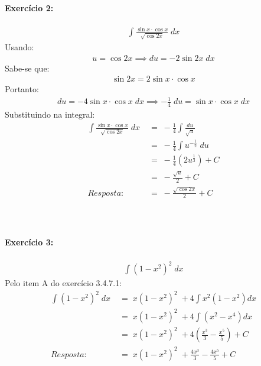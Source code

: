 \documentclass[12pt]{article}
\begin{document}
\paragraph{Exercício 2:}
\begin{align*}
\int \frac{\sin x \cdot \cos x}{\sqrt{\cos 2x}}\;dx
\end{align*}
Usando:
\begin{align*}
u = \cos 2x \implies du = -2 \sin 2x\;dx
\end{align*}
Sabe-se que:
\begin{align*}
\sin 2x = 2\sin x \cdot \cos x
\end{align*}
Portanto:
\begin{align*}
du = -4\sin x \cdot \cos x \;dx
\implies  - \frac {1}{4}\;du = \sin x \cdot \cos x \;dx
\end{align*}
Substituindo na integral:
\begin{align*}
\int \frac{\sin x \cdot \cos x}{\sqrt{\cos 2x}}\;dx 
&\;=\; - \frac {1}{4}\int \frac{du}{\sqrt{u}}\\
&\;=\;  - \frac {1}{4}\int u^{-\frac{1}{2}}\;du\\
&\;=\; - \frac {1}{4}\left ( 2u^{\frac{1}{2}} \right ) + C\\
&\;=\; -\frac{\sqrt{u}}{2} + C\\ 
Resposta: &\;=\; -\frac{\sqrt{\cos 2x}}{2} + C\\\\\\\\\\\\\\
\end{align*}


\paragraph{Exercício 3:}
\begin{align*}
\int \left ( 1-x^{2} \right )^{2} \;dx
\end{align*}
Pelo item A do exercício 3.4.7.1:
\begin{align*}
\int \left ( 1-x^{2} \right )^{2} \;dx
&\;=\; x \left ( 1-x^{2} \right )^{2} \; +4 \int x^{2} \left  (1 - x^{2}  \right ) dx\\
&\;=\; x \left ( 1-x^{2} \right )^{2} \; +4 \int \left  (x^{2} - x^{4}  \right ) dx\\
&\;=\; x \left ( 1-x^{2} \right )^{2} \; +4 \left ( \frac{x^{3}}{3} - \frac{x^{5}}{5} \right ) + C\\
Resposta: &\;=\; x \left ( 1-x^{2} \right )^{2} \; + \frac{4x^{3}}{3} - \frac{4x^{5}}{5} + C\\
\end{align*}
\end{document}
